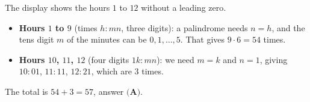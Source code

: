 The display shows the hours $1$ to $12$ without a leading zero.
\begin{itemize}
\item \textbf{Hours $1$ to $9$} (times $h{:}mn$, three digits): a palindrome needs $n=h$, and the tens digit $m$ of the minutes can be $0,1,\dots,5$. That gives $9\cdot6=54$ times.
\item \textbf{Hours $10$, $11$, $12$} (four digits $1k{:}mn$): we need $m=k$ and $n=1$, giving $10{:}01$, $11{:}11$, $12{:}21$, which are $3$ times.
\end{itemize}
The total is $54+3=57$, answer $\boxed{\textbf{(A)}}$.
